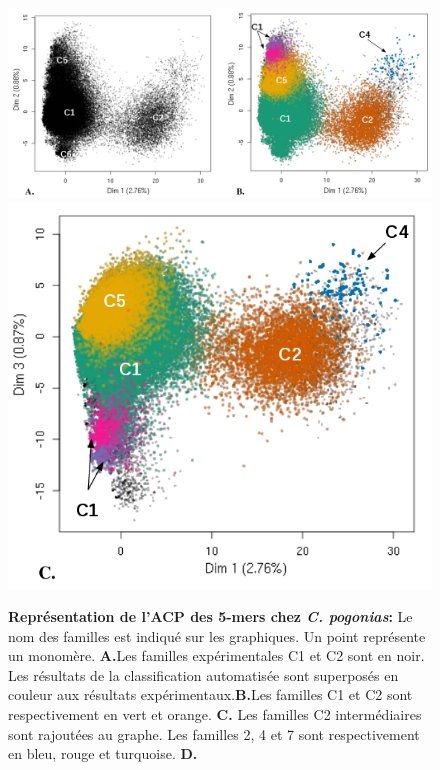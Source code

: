 \documentclass[12pt,a4paper]{article}
\begin{document}
		\begin{figure}	
		\includegraphics[scale=0.4]{img/ACP_pogonias_1.png}  \\
		\includegraphics[scale=0.4]{img/ACP_pogonias_2.png}   \\
		\caption{\textbf{Représentation de l'ACP des 5-mers chez \textit{C. pogonias}:}
		\label{fig:ACP_pogonias}			
		Le nom des familles est indiqué sur les graphiques. Un point représente un monomère. \textbf{A.}Les familles expérimentales C1 et C2 sont en noir. Les résultats de la classification automatisée sont superposés en couleur aux résultats expérimentaux.\textbf{B.}Les familles C1 et C2 sont respectivement en vert et orange. \textbf{C.} Les familles C2 intermédiaires sont rajoutées au graphe. Les familles 2, 4 et 7 sont respectivement en  bleu, rouge et turquoise. \textbf{D.}} 
		\end{figure}
		
\end{document}
